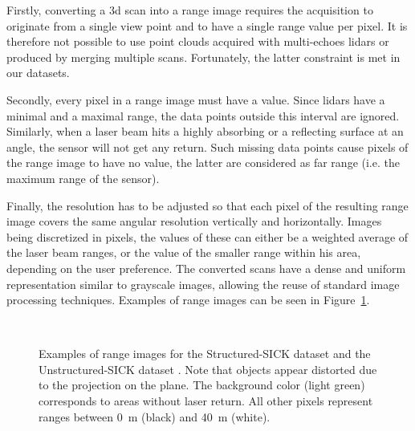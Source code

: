 Firstly, converting a \gls*{3d} scan into a range image requires the acquisition to originate from a single view point and to have a single range value per pixel. It is therefore not possible to use point clouds acquired with multi-echoes \gls*{lidar}s or produced by merging multiple scans. Fortunately, the latter constraint is met in our datasets.

Secondly, every pixel in a range image must have a value. Since \gls*{lidar}s have a minimal and a maximal range, the data points outside this interval are ignored. Similarly, when a laser beam hits a highly absorbing or a reflecting surface at an angle, the sensor will not get any return. Such missing data points cause pixels of the range image to have no value, the latter are considered as far range (i.e. the maximum range of the sensor).

Finally, the resolution has to be adjusted so that each pixel of the resulting range image covers the same angular resolution vertically and horizontally. Images being discretized in pixels, the values of these can either be a weighted average of the laser beam ranges, or the value of the smaller range within his area, depending on the user preference. The converted scans have a dense and uniform representation similar to grayscale images, allowing the reuse of standard image processing techniques. Examples of range images can be seen in Figure~\ref{fig:chap_slam_range}.

\begin{figure}[H]
    \centering
    \\
    \caption[Examples of range images from the two datasets.]{Examples of range images for the Structured-SICK dataset \protect{} and the Unstructured-SICK dataset \protect{}. Note that objects appear distorted due to the projection on the plane. The background color (light green) corresponds to areas without laser return. All other pixels represent ranges between \SI{0}{\meter} (black) and \SI{40}{\meter} (white).}
    \label{fig:chap_slam_range}
\end{figure}


